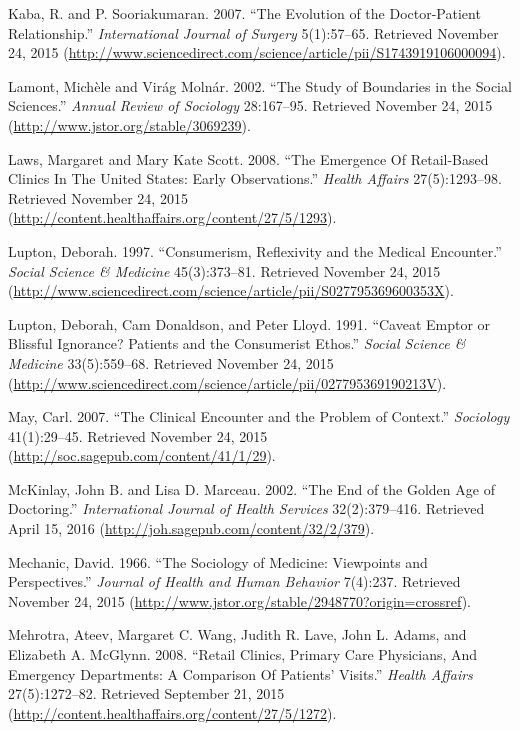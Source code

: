 \documentclass[12pt,twoside]{reedthesis}
\begin{document}
  Kaba, R. and P. Sooriakumaran. 2007. ``The Evolution of the
  Doctor-Patient Relationship.'' \emph{International Journal of Surgery}
  5(1):57--65. Retrieved November 24, 2015
  (\url{http://www.sciencedirect.com/science/article/pii/S1743919106000094}).
  
  Lamont, Mich{è}le and Vir{á}g Moln{á}r. 2002. ``The Study of Boundaries
  in the Social Sciences.'' \emph{Annual Review of Sociology} 28:167--95.
  Retrieved November 24, 2015 (\url{http://www.jstor.org/stable/3069239}).
  
  Laws, Margaret and Mary Kate Scott. 2008. ``The Emergence Of
  Retail-Based Clinics In The United States: Early Observations.''
  \emph{Health Affairs} 27(5):1293--98. Retrieved November 24, 2015
  (\url{http://content.healthaffairs.org/content/27/5/1293}).
  
  Lupton, Deborah. 1997. ``Consumerism, Reflexivity and the Medical
  Encounter.'' \emph{Social Science \& Medicine} 45(3):373--81. Retrieved
  November 24, 2015
  (\url{http://www.sciencedirect.com/science/article/pii/S027795369600353X}).
  
  Lupton, Deborah, Cam Donaldson, and Peter Lloyd. 1991. ``Caveat Emptor
  or Blissful Ignorance? Patients and the Consumerist Ethos.''
  \emph{Social Science \& Medicine} 33(5):559--68. Retrieved November 24,
  2015
  (\url{http://www.sciencedirect.com/science/article/pii/027795369190213V}).
  
  May, Carl. 2007. ``The Clinical Encounter and the Problem of Context.''
  \emph{Sociology} 41(1):29--45. Retrieved November 24, 2015
  (\url{http://soc.sagepub.com/content/41/1/29}).
  
  McKinlay, John B. and Lisa D. Marceau. 2002. ``The End of the Golden Age
  of Doctoring.'' \emph{International Journal of Health Services}
  32(2):379--416. Retrieved April 15, 2016
  (\url{http://joh.sagepub.com/content/32/2/379}).
  
  Mechanic, David. 1966. ``The Sociology of Medicine: Viewpoints and
  Perspectives.'' \emph{Journal of Health and Human Behavior} 7(4):237.
  Retrieved November 24, 2015
  (\url{http://www.jstor.org/stable/2948770?origin=crossref}).
  
  Mehrotra, Ateev, Margaret C. Wang, Judith R. Lave, John L. Adams, and
  Elizabeth A. McGlynn. 2008. ``Retail Clinics, Primary Care Physicians,
  And Emergency Departments: A Comparison Of Patients' Visits.''
  \emph{Health Affairs} 27(5):1272--82. Retrieved September 21, 2015
  (\url{http://content.healthaffairs.org/content/27/5/1272}).
  
\end{document}
